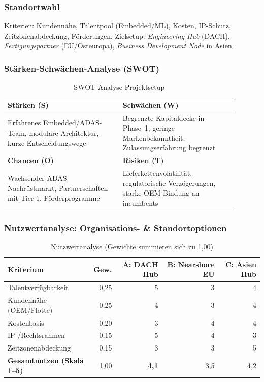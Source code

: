 \documentclass[
%
ngerman %
%
numeric %
]{wbh-assignment}
\begin{document}
\subsubsection{Standortwahl}
Kriterien: Kundennähe, Talentpool (Embedded/ML), Kosten, IP-Schutz, Zeitzonenabdeckung, Förderungen. Zielsetup: \emph{Engineering-Hub} (DACH), \emph{Fertigungspartner} (EU/Osteuropa), \emph{Business Development Node} in Asien.

\subsubsection{Stärken-Schwächen-Analyse (SWOT)}
\begin{table}[htb!]
\centering
\caption{SWOT-Analyse Projektsetup}
\begin{tabular}{p{0.45\linewidth} p{0.45\linewidth}}
\textbf{Stärken (S)} & \textbf{Schwächen (W)} \\
\hline
Erfahrenes Embedded/ADAS-Team, modulare Architektur, kurze Entscheidungswege &
Begrenzte Kapitaldecke in Phase~1, geringe Markenbekanntheit, Zulassungserfahrung begrenzt \\
\textbf{Chancen (O)} & \textbf{Risiken (T)} \\
\hline
Wachsender ADAS-Nachrüstmarkt, Partnerschaften mit Tier-1, Förderprogramme &
Lieferkettenvolatilität, regulatorische Verzögerungen, starke OEM-Bindung an incumbents \\
\end{tabular}
\end{table}

\subsubsection{Nutzwertanalyse: Organisations- \& Standortoptionen}
\begin{table}[htb!]
\centering
\caption{Nutzwertanalyse (Gewichte summieren sich zu 1{,}00)}
\begin{tabular}{l r r r r}
\textbf{Kriterium} & \textbf{Gew.} & \textbf{A: DACH Hub} & \textbf{B: Nearshore EU} & \textbf{C: Asien Hub} \\
\hline
Talentverfügbarkeit & 0{,}25 & 5 & 3 & 4 \\
Kundennähe (OEM/Flotte) & 0{,}25 & 4 & 3 & 4 \\
Kostenbasis & 0{,}20 & 3 & 4 & 4 \\
IP-/Rechtsrahmen & 0{,}15 & 5 & 4 & 3 \\
Zeitzonenabdeckung & 0{,}15 & 3 & 3 & 5 \\
\hline
\textbf{Gesamtnutzen (Skala 1–5)} & 1{,}00 & \textbf{4{,}1} & 3{,}5 & 4{,}2 \\
\end{tabular}
\end{table}
\end{document}
